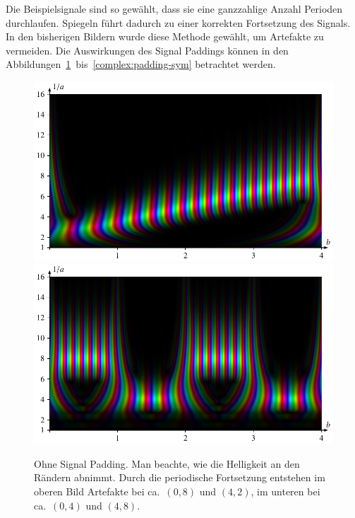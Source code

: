 Die Beispielsignale sind so gewählt, dass sie eine ganzzahlige Anzahl Perioden durchlaufen. 
Spiegeln führt dadurch zu einer korrekten Fortsetzung des Signals.
In den bisherigen Bildern wurde diese Methode gewählt, um Artefakte zu vermeiden.
Die Auswirkungen des Signal Paddings können in den Abbildungen~\ref{complex:padding-none}~bis~\ref{complex:padding-sym} betrachtet werden.
\begin{figure}
	\centering
	\includegraphics[width=\linewidth, keepaspectratio]{papers/complex/images/padding_none_sweep.pdf}
	\includegraphics[width=\linewidth, keepaspectratio]{papers/complex/images/padding_none_square.pdf}
	\caption{Ohne Signal Padding. Man beachte, wie die Helligkeit an den Rändern abnimmt. Durch die periodische Fortsetzung entstehen im oberen Bild Artefakte bei ca.~$(0, 8)$ und $(4, 2)$, im unteren bei ca.~$(0,4)$ und $(4,8)$.} \label{complex:padding-none}
\end{figure}

